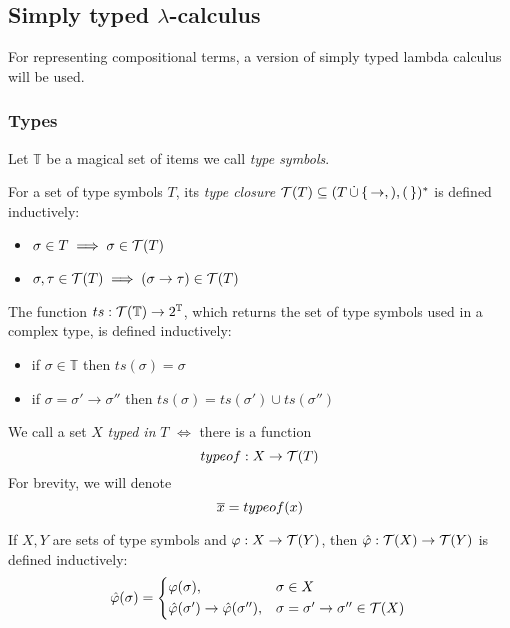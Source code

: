 \documentclass[main.tex]{subfiles}
\begin{document}
\subsection{Simply typed $\lambda$-calculus}
\label{sec:purelambda}

For representing compositional terms, a version of simply typed lambda calculus
will be used.

\subsubsection{Types}
\label{purelambda:types}
Let $\mathbb{T}$ be a magical set of items we call
    \emph{type symbols}.

\begin{defn}
    For a set of type symbols $T$, its \emph{type closure}
    $\mathcal{T}( T ) \subseteq (T \, \dot\cup \,\{\, \rightarrow, ), ( \,\})^*$ is defined
    inductively:

    \begin{itemize}
        \item $\sigma \in T \implies \sigma \in \mathcal{T}( T )$
        \item $\sigma, \tau \in \mathcal{T}( T ) \implies (\sigma \rightarrow \tau) \in \mathcal{T}( T )$
    \end{itemize}
\end{defn}

\begin{defn}
    The function $ts : \mathcal{T}( \mathbb{T} ) \rightarrow 2^\mathbb{T}$, which
    returns the set of type symbols used in a complex type, is defined inductively:

    \begin{itemize}
        \item if $\sigma \in \mathbb{T}$ then $ts(\sigma) = \sigma$
        \item if $\sigma = \sigma' \rightarrow \sigma''$ then
            $ts(\sigma) = ts(\sigma') \cup ts(\sigma'')$
    \end{itemize}
\end{defn}

\begin{defn}
    We call a set $X$ \emph{typed in} $T$ $\iff$ there is a function
    \[ typeof : X \rightarrow \mathcal{T}( T ) \]
    For brevity, we will denote
    \[ \overline{x} = typeof(x) \]
\end{defn}

\begin{defn}
    If $X, Y$ are sets of type symbols and $\varphi: X \rightarrow \mathcal{T}( Y )$,
    then $\hat{\varphi} : \mathcal{T}( X ) \rightarrow \mathcal{T}( Y )$ is defined inductively:
    \begin{equation*}
        \hat{\varphi}(\sigma) =
        \begin{cases*}
            \varphi(\sigma), & $\sigma \in X$ \\
            \hat{\varphi}(\sigma') \rightarrow \hat{\varphi}(\sigma''), &
                $\sigma = \sigma' \rightarrow \sigma'' \in \tclos{X}$ \\
        \end{cases*}
    \end{equation*}
\end{defn}
\end{document}
